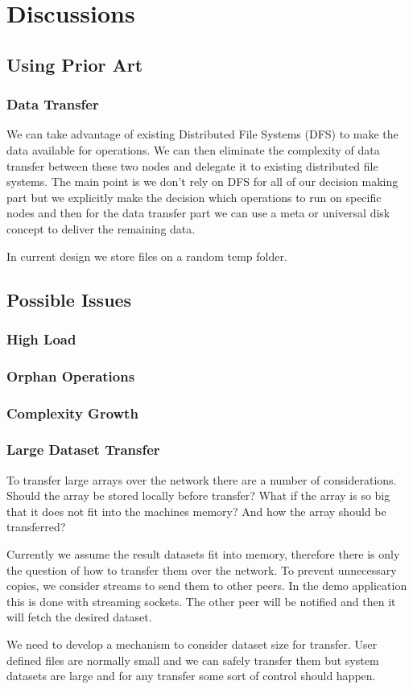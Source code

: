 \chapter{Discussions}
\label{cha:discussions}

\section{Using Prior Art}
\subsection{Data Transfer}
We can take advantage of existing Distributed File Systems
(DFS) to make the data available for operations. We can then eliminate
the complexity of data transfer between these two nodes and delegate it
to existing distributed file systems. The main point is we don't rely on
DFS for all of our decision making part but we explicitly make the 
decision which operations to run on specific nodes and then for the 
data transfer part we can use a meta or universal disk concept to deliver the
remaining data.

In current design we store files on a random temp folder.

\section{Possible Issues}
\subsection{High Load}
\subsection{Orphan Operations}
\subsection{Complexity Growth}

\subsection{Large Dataset Transfer}
To transfer large arrays over the network there are a number of considerations. Should the array be stored locally before transfer?
What if the array is so big that it does not fit into the machines memory? And how the array should be transferred?

Currently we assume the result datasets fit into memory, therefore there is only the question of how 
to transfer them over the network. To prevent unnecessary copies, we consider streams to send them to
other peers. In the demo application this is done with streaming sockets. The other peer will be notified and then it will fetch the desired dataset.

We need to develop a mechanism to consider dataset size for transfer. User defined files are normally small and we can safely transfer them but
system datasets are large and for any transfer some sort of control should happen.